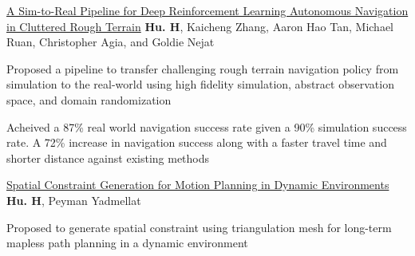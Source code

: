 


\begin{cventries}
  \cvpublicationentrysimple
    {\href{https://ieeexplore.ieee.org/document/9468918}{A Sim-to-Real Pipeline for Deep Reinforcement Learning Autonomous Navigation in Cluttered Rough Terrain}} %
    {\textbf{Hu. H}, Kaicheng Zhang, Aaron Hao Tan, Michael Ruan, Christopher Agia, and Goldie Nejat \hspace*{0pt}\hfill {}} %
    {
    \begin{cvitems}
      \item{
        Proposed a pipeline to transfer challenging rough terrain navigation policy from simulation to the real-world using high fidelity simulation, abstract observation space, and domain randomization
      }
      \item{
        Acheived a 87\% real world navigation success rate given a 90\% simulation success rate. A 72\% increase in navigation success along with a faster travel time and shorter distance against existing methods
			}
    \end{cvitems}
    }
  \cvpublicationentrysimple
    {\href{https://arxiv.org/abs/2110.14786}{Spatial Constraint Generation for Motion Planning in Dynamic Environments}} %
    {\textbf{Hu. H}, Peyman Yadmellat \hspace*{0pt}\hfill {}} %
    {
    \begin{cvitems}
      \item {Proposed to generate spatial constraint using triangulation mesh for long-term mapless path planning in a dynamic environment}

\end{cvitems}}
\end{cventries}
